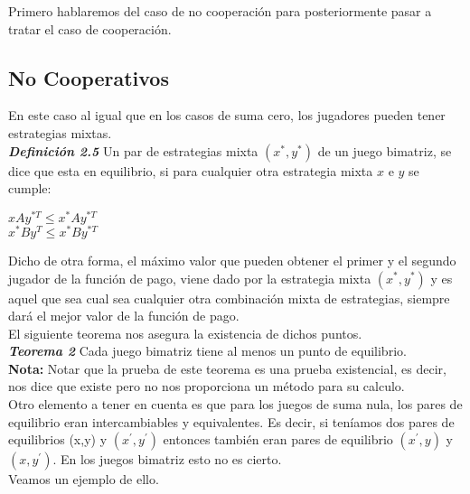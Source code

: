 \documentclass[10pt,a4paper]{book}
\begin{document}
Primero hablaremos del caso de no cooperación para posteriormente pasar a tratar el caso de cooperación.\\

\subsection{No Cooperativos}

En este caso al igual que en los casos de suma cero, los jugadores pueden tener estrategias mixtas.\\


\textit{\textbf{Definición 2.5}} Un par de estrategias mixta $(x^{*},y^{*})$ de un juego bimatriz, se dice que esta en equilibrio, si para cualquier otra estrategia mixta $x$ e $y$ se cumple:\\

\begin{center}

$xAy^{*T} \leq x^{*}Ay^{*T}$\\
$x^{*}By^{T} \leq x^{*}By^{*T}$

\end{center}

Dicho de otra forma, el máximo valor que pueden obtener el primer y el segundo jugador de la función de pago, viene dado por la estrategia mixta $(x^{*},y^{*})$ y es aquel que sea cual sea cualquier otra combinación mixta de estrategias, siempre dará el mejor valor de la función de pago.\\

El siguiente teorema nos asegura la existencia de dichos puntos.\\

\textit{\textbf{Teorema 2}} Cada juego bimatriz tiene al menos un punto de equilibrio.\\

\textbf{Nota:} Notar que la prueba de este teorema es una prueba existencial, es decir, nos dice que existe pero no nos proporciona un método para su calculo.\\

Otro elemento a tener en cuenta es que para los juegos de suma nula, los pares de equilibrio eran intercambiables y equivalentes. Es decir, si teníamos dos pares de equilibrios (x,y) y $(x^{'},y^{'})$ entonces también eran pares de equilibrio $(x^{'},y)$ y $(x,y^{'})$. En los juegos bimatriz esto no es cierto.\\ Veamos un ejemplo de ello.\\
\end{document}

